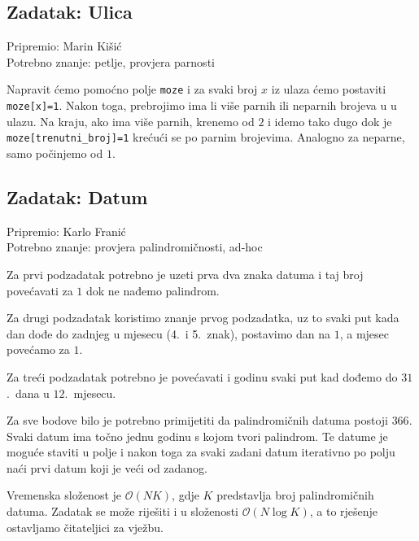 \subsection*{Zadatak: Ulica}
\textsf{Pripremio: Marin Kišić}\\
\textsf{Potrebno znanje: petlje, provjera parnosti}

Napravit ćemo pomoćno polje \texttt{moze} i za svaki broj $x$ iz ulaza ćemo
postaviti \texttt{moze[x]=1}. Nakon toga, prebrojimo ima li više parnih ili
neparnih brojeva u u ulazu. Na kraju, ako ima više parnih, krenemo od $2$ i
idemo tako dugo dok je \texttt{moze[trenutni\_broj]=1} krećući se po parnim
brojevima. Analogno za neparne, samo počinjemo od $1$.

\subsection*{Zadatak: Datum}
\textsf{Pripremio: Karlo Franić}\\
\textsf{Potrebno znanje: provjera palindromičnosti, ad-hoc}

Za prvi podzadatak potrebno je uzeti prva dva znaka datuma i taj broj
povećavati za $1$ dok ne nađemo palindrom.

Za drugi podzadatak koristimo znanje
prvog podzadatka, uz to svaki put kada dan dođe do zadnjeg u mjesecu (4.\ i 5.\
znak), postavimo dan na $1$, a mjesec povećamo za $1$.

Za treći podzadatak potrebno
je povećavati i godinu svaki put kad dođemo do $31$.\ dana u $12$.\ mjesecu.

Za sve
bodove bilo je potrebno primijetiti da palindromičnih datuma postoji $366$. Svaki
datum ima točno jednu godinu s kojom tvori palindrom. Te datume je moguće
staviti u polje i nakon toga za svaki zadani datum iterativno po polju naći
prvi datum koji je veći od zadanog.

Vremenska složenost je $\mathcal{O}(NK)$, gdje $K$ predstavlja broj
palindromičnih datuma. Zadatak se može riješiti i u složenosti $\mathcal{O}(N
\log K)$, a to rješenje ostavljamo čitateljici za vježbu.
